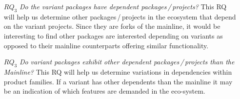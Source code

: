 \begin{itemize}
\item[\textbf{$RQ_3$}] \textit{Do the variant packages have dependent packages\,/\,projects?}
This RQ will help us determine other packages\,/\,projects in the ecosystem that depend on the variant projects.
Since they are forks of the mainline, it would be interesting to find other packages are interested depending on variants as opposed to their mainline counterparts offering similar functionality.


\item[\textbf{$RQ_3$}] \textit{Do variant packages exhibit other dependent packages\,/\,projects than the Mainline?}
This RQ will help us determine variations in dependencies within product families.
If a variant has other dependents than the mainline it may be an indication of which features are demanded in the eco-system.


\end{itemize}
